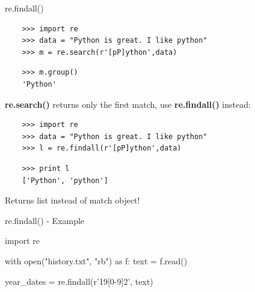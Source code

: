 \documentclass[xcolor=table,10pt]{beamer}
\begin{document}
\begin{frame}[fragile]{re.findall()}

  \begin{verbatim}
    >>> import re
    >>> data = "Python is great. I like python"
    >>> m = re.search(r'[pP]ython',data)
  \end{verbatim}
  \pause
  \vspace{-10pt}
  \begin{verbatim} 
    >>> m.group()
    'Python'
  \end{verbatim}

  \bigskip
  \pause
  \begin{arrowlist}
    \item  \textbf{re.search()} returns only the first match, use
      \textbf{re.findall()} instead:
  \end{arrowlist}
  \bigskip
  \pause

  \begin{verbatim}
    >>> import re
    >>> data = "Python is great. I like python"
    >>> l = re.findall(r'[pP]ython',data)
  \end{verbatim}
  \pause
  \vspace{-10pt}
  \begin{verbatim} 
    >>> print l
    ['Python', 'python']
  \end{verbatim}

  \bigskip
  \pause
  \begin{arrowlist}
    \item  Returns list instead of match object!
  \end{arrowlist}


\end{frame}


\begin{frame}[fragile]{re.findall() - Example}

  \begin{mlinepython}
    import re

    with open("history.txt", "rb") as f:
        text = f.read()

    year_dates = re.findall(r'19[0-9]{2}', text)
  \end{mlinepython}
 
\end{frame}
\end{document}
